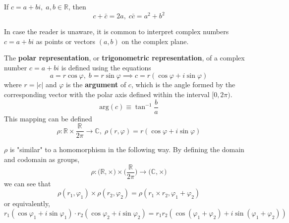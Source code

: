   If $c = a + b i, \; a, b \in \mathbb{R}$, then 
  \begin{equation}
    c + \bar{c} = 2a, \; c \bar{c} = a^2 + b^2
  \end{equation}

  In case the reader is unaware, it is common to interpret complex numbers $c = a + b i$ as points or vectors $(a, b)$ on the complex plane. 

  \begin{definition}
    The \textbf{polar representation}, or \textbf{trigonometric representation}, of a complex number $c = a + b i$ is defined using the equations 
    \begin{equation}
      a = r \cos{\varphi}, \; b = r\sin{\varphi} \implies c = r (\cos{\varphi} + i \sin{\varphi})
    \end{equation}
    where $r = |c|$ and $\varphi$ is the \textbf{argument} of $c$, which is 
    the angle formed by the corresponding vector with the polar axis defined within the interval $[0, 2\pi)$. 
    \begin{equation}
      \text{arg}(c) \equiv \tan^{-1}{\frac{b}{a}}
    \end{equation}
    This mapping can be defined 
    \begin{equation}
      \rho: \mathbb{R} \times \frac{\mathbb{R}}{2 \pi} \longrightarrow \mathbb{C}, \; \rho(r, \varphi) = r (\cos{\varphi} + i \sin{\varphi})
    \end{equation}
  \end{definition}

  \begin{theorem}
    $\rho$ is "similar" to a homomorphism in the following way. By defining the domain and codomain as groups, 
    \begin{equation}
      \rho: \big( \mathbb{R}, \times \big) \times \Big( \frac{\mathbb{R}}{2 \pi} \Big) \longrightarrow \big( \mathbb{C}, \times \big)
    \end{equation}
    we can see that
    \begin{equation}
      \rho (r_1, \varphi_1) \times \rho(r_2, \varphi_2) = \rho(r_1 \times r_2, \varphi_1 + \varphi_2) 
    \end{equation}
    or equivalently, 
    \begin{equation}
      r_1 (\cos{\varphi_1} + i \sin{\varphi_1}) \cdot r_2 (\cos{\varphi_2} + i \sin{\varphi_2}) = r_1 r_2 (\cos{(\varphi_1 + \varphi_2)} + i \sin{(\varphi_1 + \varphi_2)})
    \end{equation}
  \end{theorem}

